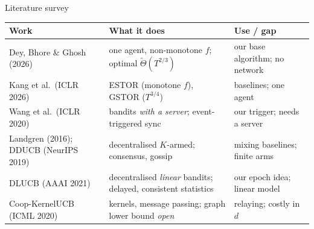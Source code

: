 \documentclass[11pt]{beamer}
\begin{document}
\begin{frame}{Literature survey}
\scriptsize
\renewcommand{\arraystretch}{1.3}
\begin{tabular}{@{}>{\raggedright\arraybackslash}p{2.9cm}>{\raggedright\arraybackslash}p{4.1cm}>{\raggedright\arraybackslash}p{3.7cm}@{}}
\toprule
\textbf{Work} & \textbf{What it does} & \textbf{Use / gap}\\
\midrule
Dey, Bhore \& Ghosh (2026) & one agent, non-monotone $f$; optimal $\tilde\Theta(T^{2/3})$ & our base algorithm; no network\\
Kang et al.\ (ICLR 2026) & ESTOR (monotone $f$), GSTOR ($T^{3/4}$) & baselines; one agent\\
Wang et al.\ (ICLR 2020) & bandits \emph{with a server}; event-triggered sync & our trigger; needs a server\\
Landgren (2016); DDUCB (NeurIPS 2019) & decentralised $K$-armed; consensus, gossip & mixing baselines; finite arms\\
DLUCB (AAAI 2021) & decentralised \emph{linear} bandits; delayed, consistent statistics & our epoch idea; linear model\\
Coop-KernelUCB (ICML 2020) & kernels, message passing; graph lower bound \emph{open} & relaying; costly in $d$\\
\bottomrule
\end{tabular}
\vspace{0.5em}
\begin{center}
\end{center}
\end{frame}
\end{document}
